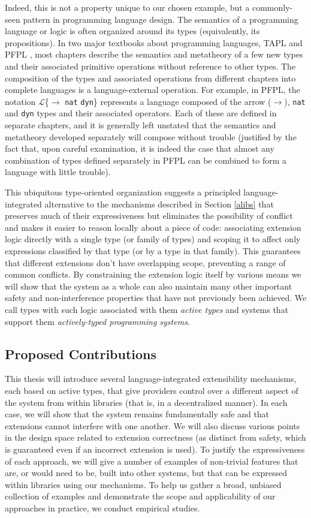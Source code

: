 Indeed, this is not a property unique to our chosen example, but a commonly-seen pattern in programming language design. The semantics of a programming language or logic is often organized around its types (equivalently, its propositions). In two major textbooks about programming languages, TAPL \cite{tapl} and PFPL \cite{pfpl}, most chapters describe the semantics and metatheory of a few new types and their associated primitive operations without reference to other types. The composition of the types and associated operations from different chapters into complete languages is a language-external operation. For example, in PFPL, the notation $\mathcal{L}$\{$\rightarrow$ \verb|nat| \verb|dyn|\} represents a language composed of the arrow ($\rightarrow$), \verb|nat| and \verb|dyn| types and their associated operators. Each of these are defined in separate chapters, and it is generally left unstated that the semantics and metatheory developed separately will compose without trouble (justified by the fact that, upon careful examination, it is indeed the case that almost any combination of types defined separately in PFPL can be combined to form a language with little trouble). 

This ubiquitous type-oriented organization suggests a principled language-integrated alternative to the mechanisms described in Section \ref{alibs} that preserves much of their expressiveness but eliminates the possibility of conflict and makes it easier to reason locally about a piece of code: associating extension logic directly with a single type (or family of types) and scoping it to affect only expressions classified by that type (or by a type in that family). This guarantees that different extensions don't have overlapping scope, preventing a range of common conflicts. By constraining the extension logic itself by various means we will show that the system as a whole can also maintain many other important safety and non-interference properties that have not previously been achieved. We call types with such logic associated with them \emph{active types} and systems that support them \emph{actively-typed programming systems}. 

\subsection{Proposed Contributions}
This thesis will introduce several language-integrated extensibility mechanisms, each based on active types, that give providers control over a different aspect of the system from within libraries (that is, in a decentralized manner). In each case, we will show that the system remains fundamentally safe and that extensions cannot interfere with one another. We will also discuss various points in the design space related to extension correctness (as distinct from safety, which is guaranteed even if an incorrect extension is used). To justify the  expressiveness of each approach, we will give a number of examples of non-trivial features that are, or would need to be, built into other systems, but that can be expressed within libraries using our mechanisms. To help us gather a broad, unbiased collection of examples and demonstrate the scope and applicability of our approaches in practice, we conduct empirical studies.

